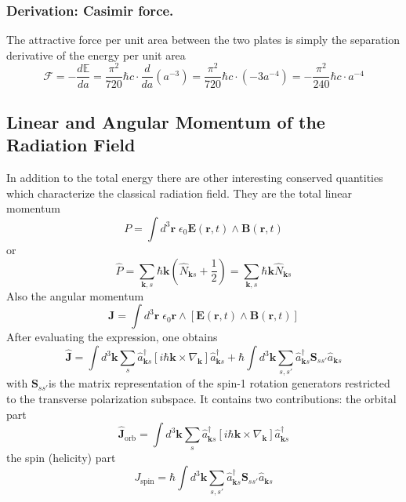 \documentclass[../../../main.tex]{subfiles}
\begin{document}
\subsubsection{Derivation: Casimir force.}
The attractive force per unit area between the two plates is simply the separation derivative of the energy per unit area
\begin{equation*}
  \mathcal{F}=-\frac{d \mathbb{E}}{da} = \frac{\pi^{2}}{720} \hbar c \cdot \frac{d}{da} \left( a^{-3} \right) = \frac{\pi^{2}}{720} \hbar c \cdot \left( -3 a^{-4} \right) = -\frac{\pi^{2}}{240} \hbar c \cdot a^{-4}
\end{equation*}

\subsection{Linear and Angular Momentum of the Radiation Field}
In addition to the total energy there are other interesting conserved quantities which characterize the classical radiation ﬁeld.
They are the total linear momentum
\begin{equation*}
  P = \int d^3 \mathbf{r} \; \epsilon_0 \mathbf{E}(\mathbf{r}, t) \wedge \mathbf{B}(\mathbf{r}, t)
\end{equation*}
or
\begin{equation*}
  \hat{P} = \sum_{\mathbf{k },s} \hbar \mathbf{k} \left( \hat{N}_{\mathbf{k} s} + \frac{1}{2} \right)
  = \sum_{\mathbf{k },s} \hbar \mathbf{k} \hat{N}_{\mathbf{k} s}
\end{equation*}
Also the angular momentum
\begin{equation*}
  \mathbf{J} = \int d^3 \mathbf{r} \; \epsilon_0 \mathbf{r} \wedge \left[ \mathbf{E}(\mathbf{r}, t) \wedge \mathbf{B}(\mathbf{r}, t) \right]
\end{equation*}
After evaluating the expression, one obtains
\begin{equation*}
  \mathbf{\hat{J}} =
  \int d^3 \mathbf{k} \sum_s \hat{a}^\dagger_{\mathbf{k }s}  \left[i \hbar \mathbf{k} \times \nabla_\mathbf{k} \right] \hat{a}^\dagger_{\mathbf{k }s}
  + \hbar \int d^3 \mathbf{k} \sum_{s,s'} \hat{a}^\dagger_{\mathbf{k }s}  \mathbf{S}_{ss'} \hat{a}_{\mathbf{k }s}
\end{equation*}
with $\mathbf{S}_{ss'}$is the matrix representation of the spin-1 rotation generators restricted to the transverse polarization subspace.
It contains two contributions: the orbital part
\begin{equation*}
  \hat{\mathbf{J}}_{\text{orb}} =
  \int d^3 \mathbf{k} \sum_s \hat{a}^\dagger_{\mathbf{k }s}  \left[ i \hbar \mathbf{k} \times \nabla_\mathbf{k} \right] \hat{a}^\dagger_{\mathbf{k }s}
\end{equation*}
the spin (helicity) part
\begin{equation*}
  J_{\text{spin}} =
  \hbar \int d^3 \mathbf{k} \sum_{s,s'} \hat{a}^\dagger_{\mathbf{k }s}  \mathbf{S}_{ss'} \hat{a}_{\mathbf{k }s}
\end{equation*}
\end{document}
